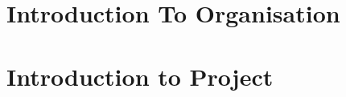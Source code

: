 \documentclass[12pt]{report}
\begin{document}

\begin{screen}
\ppttitle
\end{screen}
\footskip 0.7cm
\thispagestyle{empty} 
\pagetitle
\newpage
{}
\cfoot{\thepage}


\newpage



\newpage
\tableofcontents
\newpage
\listoffigures
\newpage

\cfoot{\thepage}

%
%

%
%
%
\newpage
\chapter{Introduction To Organisation}



\restoregeometry
\newpage
\chapter{Introduction to Project}

%
%
%
\end{document}
